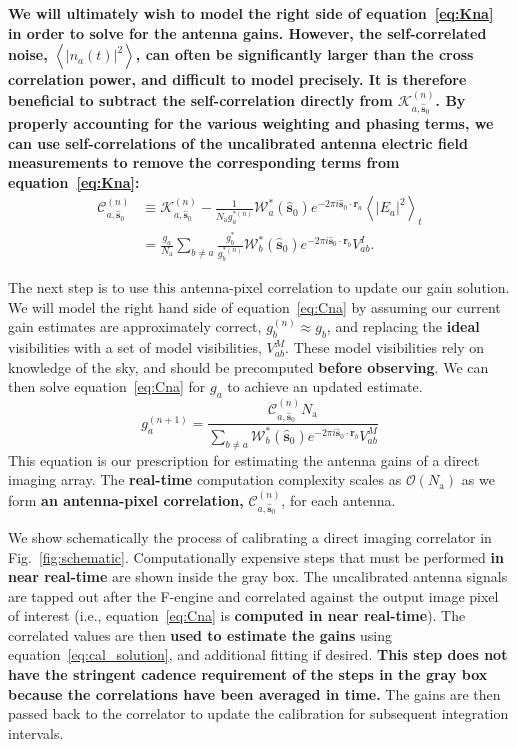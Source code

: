 \documentclass[a4paper,fleqn,usenatbib]{../mnras}
\newcommand{\Nant}{\ensuremath{N_{\mathrm{a}}}}
\newcommand{\spix}{\ensuremath{\hat{\mathbf{s}}_{0}}}
\newcommand{\Cna}[1][n]{\ensuremath{\mathcal{C}^{(#1)}_{a,\spix}}}
\newcommand{\Kna}[1][n]{\ensuremath{\mathcal{K}^{(#1)}_{a,\spix}}}
\newcommand{\ra}{\ensuremath{\mathbf{r}_a}}
\newcommand{\rb}{\ensuremath{\mathbf{r}_b}}
\begin{document}
\textbf{We will ultimately wish to model the right side of equation~\ref{eq:Kna} in order to solve for the
antenna gains. However, the self-correlated noise, $\left<|n_a(t)|^2\right>$, can often be 
significantly larger than the cross correlation power, and difficult to model precisely. It 
is therefore beneficial to subtract the self-correlation directly from $\Kna$. By properly
accounting for the various weighting and phasing terms, we can use self-correlations of the
uncalibrated antenna electric field measurements to remove the corresponding
terms from equation~\ref{eq:Kna}:}
\begin{align}\label{eq:Cna}
\Cna & \equiv \Kna - \frac{1}{\Nant g^{*(n)}_a}\mathcal{W}^*_a(\spix)e^{-2\pi i \spix \cdot \ra} \left<|E_a|^2\right>_t\nonumber \\
& = \frac{g_a}{\Nant} \sum_{b\ne a} \frac{g^*_b}{g^{*(n)}_b} \mathcal{W}^*_b(\spix) e^{-2\pi i \spix \cdot \rb} V^I_{ab}.
\end{align}

The next step is to use this antenna-pixel correlation to update our gain solution. We will model 
the right hand side of equation~\ref{eq:Cna} by assuming our current gain estimates are 
approximately correct, $g^{(n)}_b\approx g_b$, and replacing the \textbf{ideal} visibilities with a set of 
model visibilities, $V^M_{ab}$. These model visibilities rely on knowledge of the sky, and should 
be precomputed \textbf{before observing}. We can then solve equation~\ref{eq:Cna} for $g_a$ to achieve an 
updated estimate.
\begin{equation}\label{eq:cal_solution}
g^{(n+1)}_a = \frac{\Cna \Nant }{ \sum_{b\ne a} \mathcal{W}^*_b(\spix) e^{-2\pi i \spix \cdot \rb} V^M_{ab} }
\end{equation}
This equation is our prescription for estimating the antenna gains of a direct imaging array. The 
\textbf{real-time} computation complexity scales as $\mathcal{O}(\Nant)$ as we form 
\textbf{an antenna-pixel correlation,} $\Cna$, for each 
antenna. 

We show schematically the process of calibrating a direct imaging correlator in 
Fig.~\ref{fig:schematic}. Computationally expensive steps that must be performed \textbf{in near real-time} 
are shown inside the gray box. The uncalibrated antenna signals are tapped out after the 
F-engine and correlated against the output image pixel of interest (i.e., equation~\ref{eq:Cna} is 
\textbf{computed in near real-time}). The correlated values are then \textbf{used to estimate the gains}
using equation~\ref{eq:cal_solution}, and additional fitting if desired. \textbf{This step does not have
the stringent cadence requirement of the steps in the gray box because the correlations have been 
averaged in time.}
The gains are then passed back 
to the correlator to update the calibration for subsequent integration intervals. 
\end{document}
